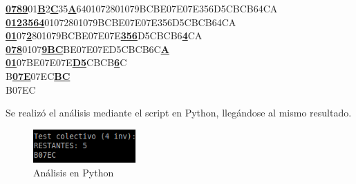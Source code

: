\documentclass{article}
\begin{document}
    \begin{center}
        \underline{\textbf{0789}}01\underline{\textbf{B}}2\underline{\textbf{C}}35\underline{\textbf{A}}6401072801079BCBE07E07E356D5CBCB64CA \\
        \underline{\textbf{0123564}}01072801079BCBE07E07E356D5CBCB64CA \\
        \underline{\textbf{01}}07\underline{\textbf{2}}801079BCBE07E07E\underline{\textbf{356}}D5CBCB6\underline{\textbf{4}}CA \\
        \underline{\textbf{078}}0107\underline{\textbf{9BC}}BE07E07ED5CBCB6C\underline{\textbf{A}} \\
        \underline{\textbf{01}}07BE07E07E\underline{\textbf{D5}}CBCB\underline{\textbf{6}}C \\
        B\underline{\textbf{07E}}07EC\underline{\textbf{BC}} \\
        B07EC \\
    \end{center} \par
    Se realizó el análisis mediante el script en Python, llegándose al mismo resultado.
    \begin{figure}[H]
        \includegraphics[width=0.35\textwidth, center]{caso-de-analisis.png}
        \caption{Análisis en Python}
    \end{figure}
\end{document}
